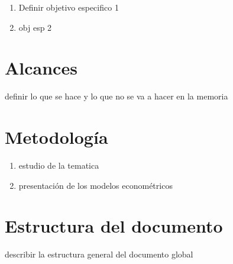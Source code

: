 \begin{enumerate}
\item Definir objetivo especifico 1
\item obj esp 2
\end{enumerate}


\section{Alcances}

definir lo que se hace y lo que no se va a hacer en la memoria

\section{Metodología}


\begin{enumerate}
\item estudio de la tematica
\item presentación de los modelos econométricos

\end{enumerate}

\newpage
\section{Estructura del documento}

describir la estructura general del documento global



